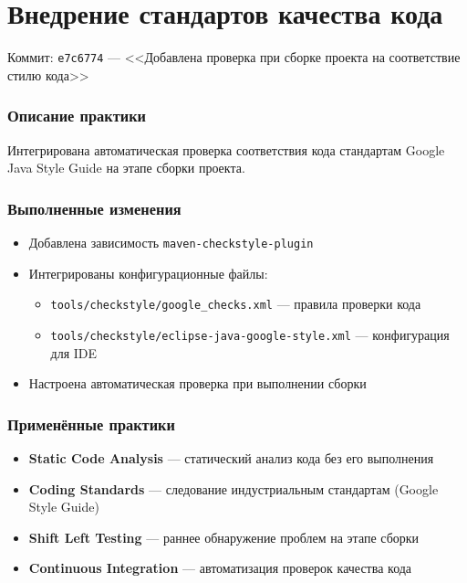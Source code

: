 \documentclass{article}
\begin{document}
\section{Внедрение стандартов качества кода}

Коммит: \texttt{e7c6774} --- <<Добавлена проверка при сборке проекта на соответствие стилю кода>>

\subsubsection{Описание практики}
Интегрирована автоматическая проверка соответствия кода стандартам Google Java Style Guide на этапе сборки проекта.

\subsubsection{Выполненные изменения}
    \begin{itemize}
    \item Добавлена зависимость \texttt{maven-checkstyle-plugin}
    \item Интегрированы конфигурационные файлы:
        \begin{itemize}
        \item \texttt{tools/checkstyle/google\_checks.xml} --- правила проверки кода
        \item \texttt{tools/checkstyle/eclipse-java-google-style.xml} --- конфигурация для IDE
        \end{itemize}
    \item Настроена автоматическая проверка при выполнении сборки
    \end{itemize}

\subsubsection{Применённые практики}
    \begin{itemize}
    \item \textbf{Static Code Analysis} --- статический анализ кода без его выполнения
    \item \textbf{Coding Standards} --- следование индустриальным стандартам (Google Style Guide)
    \item \textbf{Shift Left Testing} --- раннее обнаружение проблем на этапе сборки
    \item \textbf{Continuous Integration} --- автоматизация проверок качества кода
    \end{itemize}
\end{document}
